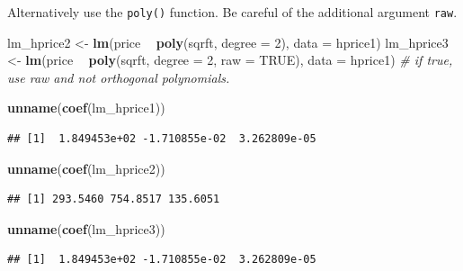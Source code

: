 \documentclass[]{book}
\newenvironment{Shaded}{\begin{snugshade}}{\end{snugshade}}
\newcommand{\CommentTok}[1]{\textcolor[rgb]{0.56,0.35,0.01}{\textit{#1}}}
\newcommand{\DataTypeTok}[1]{\textcolor[rgb]{0.13,0.29,0.53}{#1}}
\newcommand{\DecValTok}[1]{\textcolor[rgb]{0.00,0.00,0.81}{#1}}
\newcommand{\KeywordTok}[1]{\textcolor[rgb]{0.13,0.29,0.53}{\textbf{#1}}}
\newcommand{\NormalTok}[1]{#1}
\newcommand{\OperatorTok}[1]{\textcolor[rgb]{0.81,0.36,0.00}{\textbf{#1}}}
\newcommand{\OtherTok}[1]{\textcolor[rgb]{0.56,0.35,0.01}{#1}}
\newcommand{\StringTok}[1]{\textcolor[rgb]{0.31,0.60,0.02}{#1}}
\begin{document}
Alternatively use the \texttt{poly()} function. Be careful of the
additional argument \texttt{raw}.

\begin{Shaded}
\begin{Highlighting}[]
\NormalTok{lm_hprice2 <-}\StringTok{ }\KeywordTok{lm}\NormalTok{(price }\OperatorTok{~}\StringTok{ }\KeywordTok{poly}\NormalTok{(sqrft, }\DataTypeTok{degree =} \DecValTok{2}\NormalTok{),  }\DataTypeTok{data  =}\NormalTok{ hprice1) }
\NormalTok{lm_hprice3 <-}\StringTok{ }\KeywordTok{lm}\NormalTok{(price }\OperatorTok{~}\StringTok{ }\KeywordTok{poly}\NormalTok{(sqrft, }\DataTypeTok{degree =} \DecValTok{2}\NormalTok{, }\DataTypeTok{raw =} \OtherTok{TRUE}\NormalTok{),  }\DataTypeTok{data  =}\NormalTok{ hprice1) }\CommentTok{# if true, use raw and not orthogonal polynomials.}
\end{Highlighting}
\end{Shaded}

\begin{Shaded}
\begin{Highlighting}[]
\KeywordTok{unname}\NormalTok{(}\KeywordTok{coef}\NormalTok{(lm_hprice1))}
\end{Highlighting}
\end{Shaded}

\begin{verbatim}
## [1]  1.849453e+02 -1.710855e-02  3.262809e-05
\end{verbatim}

\begin{Shaded}
\begin{Highlighting}[]
\KeywordTok{unname}\NormalTok{(}\KeywordTok{coef}\NormalTok{(lm_hprice2))}
\end{Highlighting}
\end{Shaded}

\begin{verbatim}
## [1] 293.5460 754.8517 135.6051
\end{verbatim}

\begin{Shaded}
\begin{Highlighting}[]
\KeywordTok{unname}\NormalTok{(}\KeywordTok{coef}\NormalTok{(lm_hprice3))}
\end{Highlighting}
\end{Shaded}

\begin{verbatim}
## [1]  1.849453e+02 -1.710855e-02  3.262809e-05
\end{verbatim}
\end{document}
